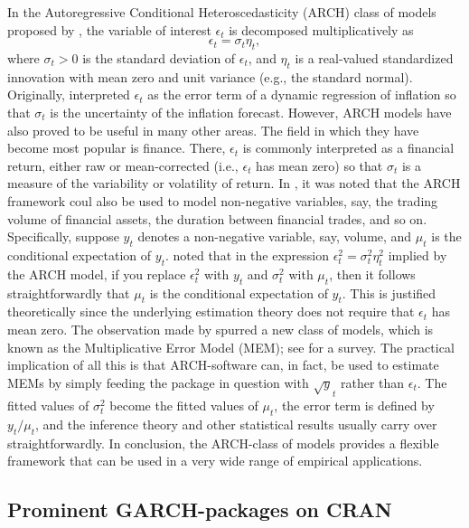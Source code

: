 In the Autoregressive Conditional Heteroscedasticity (ARCH) class of models proposed by \citet{Engle82}, the variable of interest $\epsilon_t$ is decomposed multiplicatively as
%
\begin{equation}\label{eq:epsilon}
	\epsilon_t = \sigma_t \eta_t,
\end{equation}
%
where $\sigma_t>0$ is the standard deviation of $\epsilon_t$, and $\eta_t$ is a real-valued standardized innovation with mean zero and unit variance (e.g., the standard normal). Originally, \citet{Engle82} interpreted $\epsilon_t$ as the error term of a dynamic regression of inflation so that $\sigma_t$ is the uncertainty of the inflation forecast. However, ARCH models have also proved to be useful in many other areas. The field in which they have become most popular is finance. There, $\epsilon_t$ is commonly interpreted as a financial return, either raw or mean-corrected (i.e., $\epsilon_t$ has mean zero) so that $\sigma_t$ is a measure of the variability or volatility of return. In \citet{EngleRussell1998}, it was noted that the ARCH framework coul also be used to model non-negative variables, say, the trading volume of financial assets, the duration between financial trades, and so on. Specifically, suppose $y_t$ denotes a non-negative variable, say, volume, and $\mu_t$ is the conditional expectation of $y_t$. \citet{EngleRussell1998} noted that in the expression $\epsilon_t^2 = \sigma_t^2 \eta_t^2$ implied by the ARCH model, if you replace $\epsilon_t^2$ with $y_t$ and $\sigma_t^2$ with $\mu_t$, then it follows straightforwardly that $\mu_t$ is the conditional expectation of $y_t$. This is justified theoretically since the underlying estimation theory does not require that $\epsilon_t$ has mean zero. The observation made by \citet{EngleRussell1998} spurred a new class of models, which is known as the Multiplicative Error Model (MEM); see \citet{BrownleesCipolliniGallo2012} for a survey. The practical implication of all this is that ARCH-software can, in fact, be used to estimate MEMs by simply feeding the package in question with $\sqrt{y}_t$ rather than $\epsilon_t$. The fitted values of $\sigma_t^2$ become the fitted values of $\mu_t$, the error term is defined by $y_t/\mu_t$, and the inference theory and other statistical results usually carry over straightforwardly. In conclusion, the ARCH-class of models provides a flexible framework that can be used in a very wide range of empirical applications.

\subsection{Prominent GARCH-packages on CRAN}

